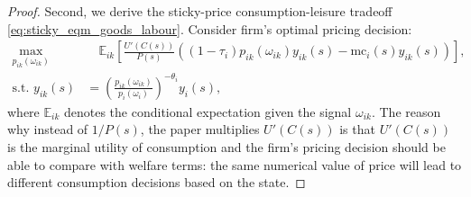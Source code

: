 \documentclass[12pt]{article}
\numberwithin{equation}{section}
\begin{document}
\begin{proof}
    Second, we derive the sticky-price consumption-leisure tradeoff \eqref{eq:sticky_eqm_goods_labour}. Consider firm's optimal pricing decision:
    \begin{align*}
        \max_{p_{ik}(\omega_{ik})} &\quad \mathbb{E}_{ik} \left[\frac{U'(C(s))}{P(s)} \left((1-\tau_i)p_{ik}(\omega_{ik}) y_{ik}(s) - \text{mc}_i(s) y_{ik}(s)\right)\right],\\
        \text{s.t. } y_{ik}(s) &= \left(\frac{p_{ik}(\omega_{ik})}{p_i(\omega_i)}\right)^{-\theta_i}y_i(s),
    \end{align*}
    where $\mathbb{E}_{ik}$ denotes the conditional expectation given the signal $\omega_{ik}$. The reason why instead of $1/P(s)$, the paper multiplies $U'(C(s))$ is that $U'(C(s))$ is the marginal utility of consumption and the firm's pricing decision should be able to compare with welfare terms: the same numerical value of price will lead to different consumption decisions based on the state. 


\end{proof}
\end{document}
